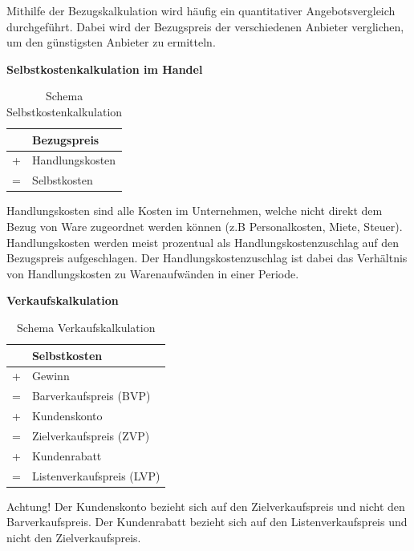 Mithilfe der Bezugskalkulation wird häufig ein quantitativer Angebotsvergleich durchgeführt. Dabei wird der Bezugspreis der verschiedenen Anbieter verglichen, um den günstigsten Anbieter zu ermitteln.

\textbf{Selbstkostenkalkulation im Handel}

\begin{table}[H]
    \centering
    \begin{tabularx}{\textwidth}{c|X}
          & Bezugspreis     \\
        \hline
        + & Handlungskosten \\
        \hline
        = & Selbstkosten    \\
    \end{tabularx}
    \caption{Schema Selbstkostenkalkulation}
    \label{tab:selbstkostenkalkulation}
\end{table}

Handlungskosten sind alle Kosten im Unternehmen, welche nicht direkt dem Bezug von Ware zugeordnet werden können (z.B Personalkosten, Miete, Steuer). Handlungskosten werden meist prozentual als Handlungskostenzuschlag auf den Bezugspreis aufgeschlagen. Der Handlungskostenzuschlag ist dabei das Verhältnis von Handlungskosten zu Warenaufwänden in einer Periode.

\textbf{Verkaufskalkulation}

\begin{table}
    [H]
    \centering
    \begin{tabularx}{\textwidth}{c|X}
          & Selbstkosten              \\
        \hline
        + & Gewinn                    \\
        \hline
        = & Barverkaufspreis (BVP)    \\
        \hline
        + & Kundenskonto              \\
        \hline
        = & Zielverkaufspreis (ZVP)   \\
        \hline
        + & Kundenrabatt              \\
        \hline
        = & Listenverkaufspreis (LVP) \\
    \end{tabularx}
    \caption{Schema Verkaufskalkulation}
    \label{tab:verkaufskalkulation}
\end{table}

Achtung! Der Kundenskonto bezieht sich auf den Zielverkaufspreis und nicht den Barverkaufspreis. Der Kundenrabatt bezieht sich auf den Listenverkaufspreis und nicht den Zielverkaufspreis.

